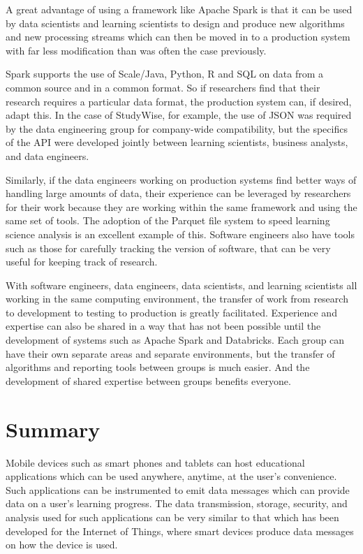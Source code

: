 \documentclass[runningheads,a4paper]{llncs}
\begin{document}
A great advantage of using a framework like Apache Spark is that it can be used by data scientists and learning scientists to design and produce new algorithms and new processing streams which can then be moved in to a production system with far less modification than was often the case previously.  

Spark supports the use of Scale/Java, Python, R and SQL on data from a common source and in a common format.  So if researchers find that their research requires a particular data format, the production system can, if desired, adapt this. In the case of StudyWise, for example, the use of JSON was required by the data engineering group for company-wide compatibility, but the specifics of the API were developed jointly between learning scientists, business analysts, and data engineers.

Similarly, if the data engineers working on production systems find better ways of handling large amounts of data, their experience can be leveraged by researchers for their work because they are working within the same framework and using the same set of tools.  The adoption of the Parquet file system to speed learning science analysis is an excellent example of this.  Software engineers also have tools such as those for carefully tracking the version of software, that can be very useful for keeping track of research.  

With software engineers, data engineers, data scientists, and learning scientists all working in the same computing environment, the transfer of work from research to development to testing to production is greatly facilitated.  Experience and expertise can also be shared in a way that has not been possible until the development of systems such as Apache Spark and Databricks.  Each group can have their own separate areas and separate environments, but the transfer of algorithms and reporting tools between groups is much easier.  And the development of shared expertise between groups  benefits everyone.
    
\section{Summary}

Mobile devices such as smart phones and tablets can host educational applications which can be used anywhere, anytime, at the user's convenience.  Such applications can be instrumented to emit data messages which can provide data on a user's learning progress.  The data transmission, storage, security, and analysis used for such applications can be very similar to that which has been developed for the Internet of Things, where smart devices produce data messages on how the device is used.  
\end{document}
